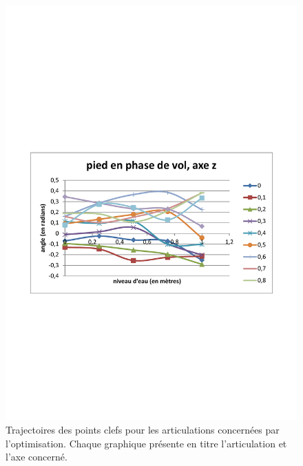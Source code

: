 \documentclass[runningheads,a4paper]{llncs}
\begin{document}
\begin{figure}[h]
\includegraphics[scale=0.3]{traj_pts_clefs/swing_foot_z.pdf}
\caption{Trajectoires des points clefs pour les articulations concernées par l'optimisation. Chaque graphique présente en titre l'articulation et l'axe concerné.}
\end{figure}
\end{document}
